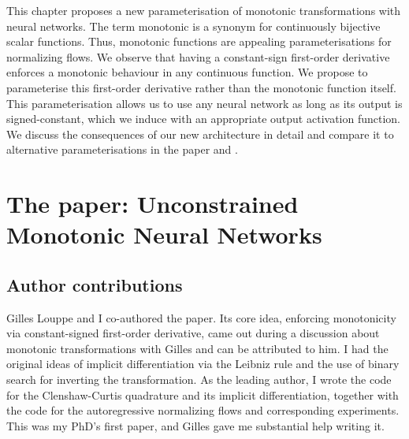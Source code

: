 This chapter proposes a new parameterisation of monotonic transformations with neural networks. The term monotonic is a synonym for continuously bijective scalar functions. Thus, monotonic functions are appealing parameterisations for normalizing flows. We observe that having a constant-sign first-order derivative enforces a monotonic behaviour in any continuous function. We propose to parameterise this first-order derivative rather than the monotonic function itself. This parameterisation allows us to use any neural network as long as its output is signed-constant, which we induce with an appropriate output activation function. We discuss the consequences of our new architecture in detail and compare it to alternative parameterisations in the paper and .

%


\section{The paper: Unconstrained Monotonic Neural Networks}
\subsection{Author contributions}
Gilles Louppe and I co-authored the paper. Its core idea, enforcing monotonicity via constant-signed first-order derivative, came out during a discussion about monotonic transformations with Gilles and can be attributed to him. I had the original ideas of implicit differentiation via the Leibniz rule and the use of binary search for inverting the transformation. As the leading author, I wrote the code for the Clenshaw-Curtis quadrature and its implicit differentiation, together with the code for the autoregressive normalizing flows and corresponding experiments. This was my PhD's first paper, and Gilles gave me substantial help writing it.

